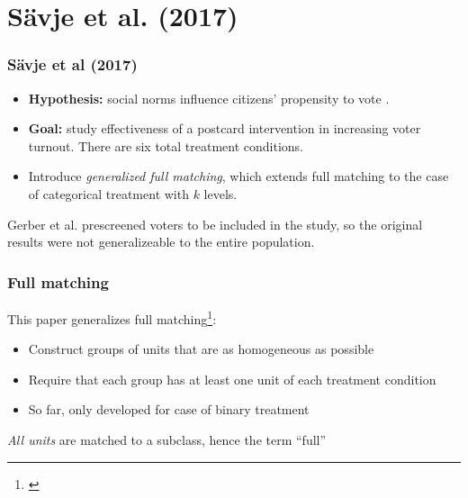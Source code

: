 
\section{S\"avje et al. (2017)}


\begin{frame}
  \frametitle{S\"avje et al (2017)}
  
  \begin{itemize}
  \item \textbf{Hypothesis:} social norms influence citizens'
    propensity to vote \citep*{gerber2008social}.
  \item \textbf{Goal:} study effectiveness of a postcard intervention
    in increasing voter turnout.  There are six total treatment conditions. 
  \item Introduce \emph{generalized full matching}, which extends full
    matching to the case of categorical treatment with $k$ levels.
  \end{itemize}
  
  \medskip

  Gerber et al. prescreened voters to be included in the study, so the
  original results were not generalizeable to the entire population.
    
\end{frame}


\begin{frame}
  \frametitle{Full matching}
  
  This paper generalizes full
  matching\footnote{\cite{rosenbaum2001,hansen2004,stuart2008}}: \medskip
  
  \begin{itemize}
  \item Construct groups of units that are as homogeneous as possible \medskip 
  \item Require that each group has at least one unit of each
    treatment condition \medskip
  \item So far, only developed for case of binary treatment
  \end{itemize}


  \bigskip

  \emph{All units} are matched to a subclass, hence the term ``full''

\end{frame}

